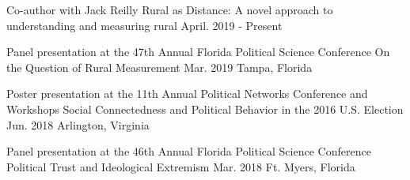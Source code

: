 

\begin{cventries}



\cventry
  {Co-author with Jack Reilly} %
  {Rural as Distance: A novel approach to understanding and measuring rural} %
  {April. 2019 - Present} %
  {} %
  {}

\vspace{-.25cm}
\cventry
  {Panel presentation at the 47th Annual Florida Political Science Conference} %
  {On the Question of Rural Measurement} %
  {Mar. 2019} %
  {Tampa, Florida} %
  {}

\vspace{-.25cm}
\cventry
  {Poster presentation at the 11th Annual Political Networks Conference and Workshops} %
  {Social Connectedness and Political Behavior in the 2016 U.S. Election} %
  {Jun. 2018} %
  {Arlington, Virginia} %
  {}

\vspace{-.25cm}
\cventry
  {Panel presentation at the 46th Annual Florida Political Science Conference} %
  {Political Trust and Ideological Extremism} %
  {Mar. 2018} %
  {Ft. Myers, Florida} %
  {}

\vspace{-.25cm}


\end{cventries}
